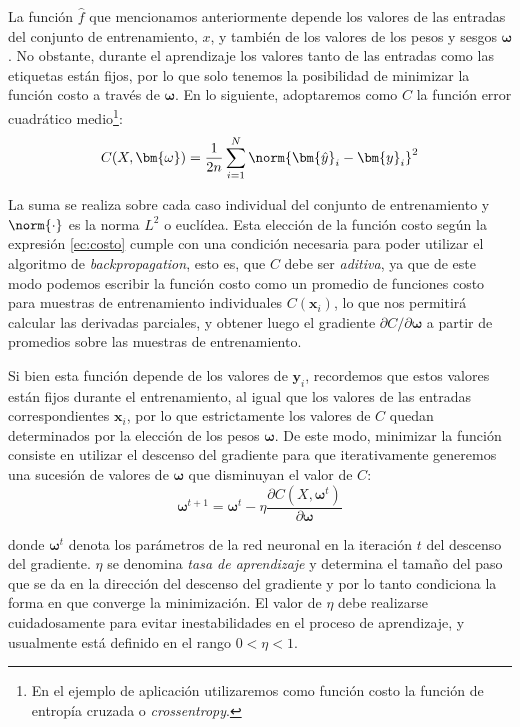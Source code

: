 La función $\hat{f}$ que mencionamos anteriormente depende los valores de las entradas del conjunto de entrenamiento, $x$, y también de los valores de los pesos y sesgos $\bm{\omega}$. No obstante, durante el aprendizaje los valores tanto de las entradas como las etiquetas están fijos, por lo que solo tenemos la posibilidad de minimizar la función costo a través de $\bm{\omega}$. En lo siguiente, adoptaremos como $C$ la función error cuadrático medio\footnote{En el ejemplo de aplicación utilizaremos como función costo la función de entropía cruzada o \textit{crossentropy}.}:
\begin{equation} C(X, \bm{\omega}) = \frac{1}{2n} \sum_{i=1}^N \norm{\bm{\hat{y}}_i - \bm{y}_i}^2 \label{ec:costo} \end{equation}

La suma se realiza sobre cada caso individual del conjunto de entrenamiento y $\norm{\cdot}$ es la norma $L^2$ o euclídea. Esta elección de la función costo según la expresión \eqref{ec:costo} cumple con una condición necesaria para poder utilizar el algoritmo de \textit{backpropagation}, esto es, que $C$ debe ser \textit{aditiva}, ya que de este modo podemos escribir la función costo como un promedio de funciones costo para muestras de entrenamiento individuales $C(\bm{x}_i)$, lo que nos permitirá calcular las derivadas parciales, y obtener luego el gradiente $\partial C / \partial \bm{\omega}$ a partir de promedios sobre las muestras de entrenamiento.

Si bien esta función depende de los valores de $\bm{y}_i$, recordemos que estos valores están fijos durante el entrenamiento, al igual que los valores de las entradas correspondientes $\bm{x}_i$, por lo que estrictamente los valores de $C$ quedan determinados por la elección de los pesos $\bm{\omega}$. De este modo, minimizar la función consiste en utilizar el descenso del gradiente para que iterativamente generemos una sucesión de valores de $\bm{\omega}$ que disminuyan el valor de $C$:
\begin{equation}\bm{\omega}^{t+1} = \bm{\omega}^t - \eta \frac{\partial C(X, \bm{\omega}^t)}{\partial \bm{\omega}}
\label{eq:actpesos}
\end{equation}

donde $\bm{\omega}^t$ denota los parámetros de la red neuronal en la iteración $t$ del descenso del gradiente. $\eta$ se denomina \textit{tasa de aprendizaje} y determina el tamaño del paso que se da en la dirección del descenso del gradiente y por lo tanto condiciona la forma en que converge la minimización. El valor de $\eta$ debe realizarse cuidadosamente para evitar inestabilidades en el proceso de aprendizaje, y usualmente está definido en el rango $0 < \eta < 1$.

